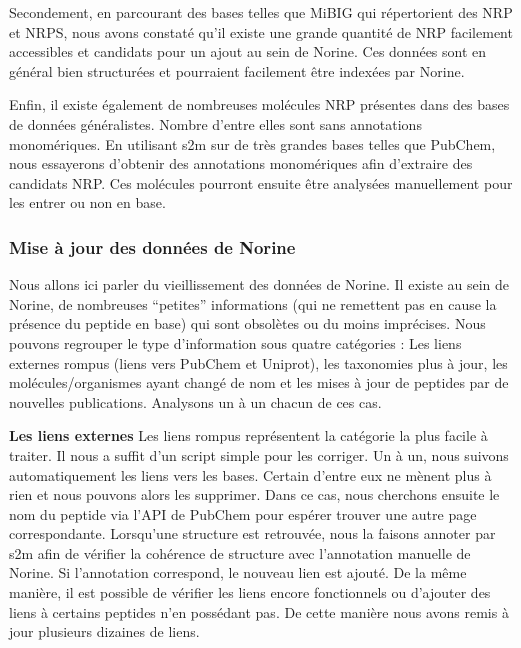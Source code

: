 Secondement, en parcourant des bases telles que MiBIG qui répertorient des NRP et NRPS, nous avons constaté qu'il existe une grande quantité de NRP facilement accessibles et candidats pour un ajout au sein de Norine.
Ces données sont en général bien structurées et pourraient facilement être indexées par Norine.

Enfin, il existe également de nombreuses molécules NRP présentes dans des bases de données généralistes.
Nombre d'entre elles sont sans annotations monomériques.
En utilisant s2m sur de très grandes bases telles que PubChem, nous essayerons d'obtenir des annotations monomériques afin d'extraire des candidats NRP.
Ces molécules pourront ensuite être analysées manuellement pour les entrer ou non en base.


\subsubsection{Mise à jour des données de Norine}

Nous allons ici parler du vieillissement des données de Norine.
Il existe au sein de Norine, de nombreuses ``petites'' informations (qui ne remettent pas en cause la présence du peptide en base) qui sont obsolètes ou du moins imprécises.
Nous pouvons regrouper le type d'information sous quatre catégories : Les liens externes rompus (liens vers PubChem et Uniprot), les taxonomies plus à jour, les molécules/organismes ayant changé de nom et les mises à jour de peptides par de nouvelles publications.
Analysons un à un chacun de ces cas.


\textbf{Les liens externes} 
Les liens rompus représentent la catégorie la plus facile à traiter.
Il nous a suffit d'un script simple pour les corriger.
Un à un, nous suivons automatiquement les liens vers les bases.
Certain d'entre eux ne mènent plus à rien et nous pouvons alors les supprimer.
Dans ce cas, nous cherchons ensuite le nom du peptide via l'API de PubChem pour espérer trouver une autre page correspondante.
Lorsqu'une structure est retrouvée, nous la faisons annoter par s2m afin de vérifier la cohérence de structure avec l'annotation manuelle de Norine.
Si l'annotation correspond, le nouveau lien est ajouté.
De la même manière, il est possible de vérifier les liens encore fonctionnels ou d'ajouter des liens à certains peptides n'en possédant pas.
De cette manière nous avons remis à jour plusieurs dizaines de liens.


